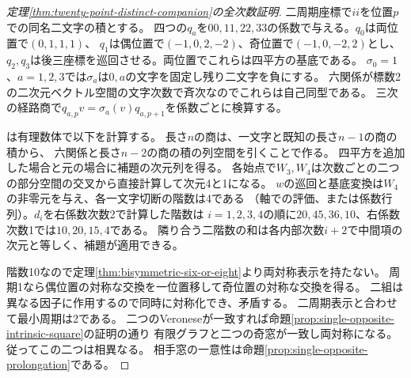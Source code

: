 \begin{proof}[定理\ref{thm:twenty-point-distinct-companion}の全次数証明]
二周期座標で$ii$を位置$p$での同名二文字の積とする。
四つの$q_a$を$00,11,22,33$の係数で与える。$q_0$は両位置で$(0,1,1,1)$、
$q_1$は偶位置で$(-1,0,2,-2)$、奇位置で$(-1,0,-2,2)$とし、
$q_2,q_3$は後三座標を巡回させる。両位置でこれらは四平方の基底である。
$\sigma_0=1$、$a=1,2,3$では$\sigma_a$は$0,a$の文字を固定し残り二文字を負にする。
六関係が標数2の二次元ベクトル空間の文字次数で斉次なのでこれらは自己同型である。
三次の経路商で$ q_{a,p}v=\sigma_a(v)q_{a,p+1}$を係数ごとに検算する。

は有理数体で以下を計算する。
長さ$n$の商は、一文字と既知の長さ$n-1$の商の積から、
六関係と長さ$n-2$の商の積の列空間を引くことで作る。
四平方を追加した場合と元の場合に補題の次元列を得る。
各始点で$W_3,W_4$は次数ごとの二つの部分空間の交叉から直接計算して次元4と1になる。
$w$の巡回と基底変換は$W_4$の非零元を与え、各一文字切断の階数は4である
（軸での評価、または係数行列）。$d_i$を右係数次数2で計算した階数は
$i=1,2,3,4$の順に$20,45,36,10$、右係数次数1では$10,20,15,4$である。
隣り合う二階数の和は各内部次数$i+2$で中間項の次元と等しく、補題が適用できる。

階数10なので定理\ref{thm:bisymmetric-six-or-eight}より両対称表示を持たない。
周期1なら偶位置の対称な交換を一位置移して奇位置の対称な交換を得る。
二組は異なる因子に作用するので同時に対称化でき、矛盾する。
二周期表示と合わせて最小周期は2である。
二つのVeroneseが一致すれば命題\ref{prop:single-opposite-intrinsic-square}の証明の通り
有限グラフと二つの奇窓が一致し両対称になる。従ってこの二つは相異なる。
相手窓の一意性は命題\ref{prop:single-opposite-prolongation}である。
\end{proof}
